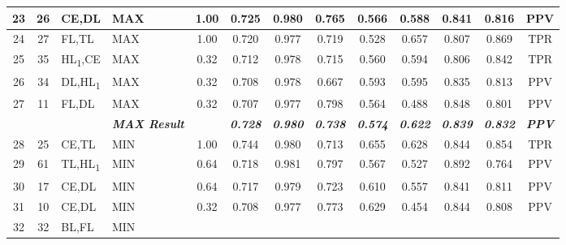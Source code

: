 \begin{table}[H]
{\begin{tabular}{ccl|l|c|c|c|c|c|c|c|c|c|}
    \multicolumn{1}{|c|}{23} &
    \multicolumn{1}{c|}{26} &
    CE,DL &
    MAX &
    1.00 &
    0.725 &
    0.980 &
    0.765 &
    0.566 &
    0.588 &
    0.841 &
    0.816 &
    PPV \\ \hline
  \multicolumn{1}{|c|}{24} &
    \multicolumn{1}{c|}{27} &
    FL,TL &
    MAX &
    1.00 &
    0.720 &
    0.977 &
    0.719 &
    0.528 &
    0.657 &
    0.807 &
    0.869 &
    TPR \\ \hline
  \multicolumn{1}{|c|}{25} &
    \multicolumn{1}{c|}{35} &
    HL\textsubscript{1},CE &
    MAX &
    0.32 &
    0.712 &
    0.978 &
    0.715 &
    0.560 &
    0.594 &
    0.806 &
    0.842 &
    TPR \\ \hline
  \multicolumn{1}{|c|}{26} &
    \multicolumn{1}{c|}{34} &
    DL,HL\textsubscript{1} &
    MAX &
    0.32 &
    0.708 &
    0.978 &
    0.667 &
    0.593 &
    0.595 &
    0.835 &
    0.813 &
    PPV \\ \hline
  \multicolumn{1}{|c|}{27} &
    \multicolumn{1}{c|}{11} &
    FL,DL &
    MAX &
    0.32 &
    0.707 &
    0.977 &
    0.798 &
    0.564 &
    0.488 &
    0.848 &
    0.801 &
    PPV \\ \hline
   &
    \textit{\textbf{}} &
     &
    \textit{\textbf{MAX Result}} &
     &
    \textit{\textbf{0.728}} &
    \textit{\textbf{0.980}} &
    \textit{\textbf{0.738}} &
    \textit{\textbf{0.574}} &
    \textit{\textbf{0.622}} &
    \textit{\textbf{0.839}} &
    \textit{\textbf{0.832}} &
    \textit{\textbf{PPV}} \\ \hline
  \multicolumn{1}{|c|}{28} &
    \multicolumn{1}{c|}{25} &
    CE,TL &
    MIN &
    1.00 &
    0.744 &
    0.980 &
    0.713 &
    0.655 &
    0.628 &
    0.844 &
    0.854 &
    TPR \\ \hline
  \multicolumn{1}{|c|}{29} &
    \multicolumn{1}{c|}{61} &
    TL,HL\textsubscript{1} &
    MIN &
    0.64 &
    0.718 &
    0.981 &
    0.797 &
    0.567 &
    0.527 &
    0.892 &
    0.764 &
    PPV \\ \hline
  \multicolumn{1}{|c|}{30} &
    \multicolumn{1}{c|}{17} &
    CE,DL &
    MIN &
    0.64 &
    0.717 &
    0.979 &
    0.723 &
    0.610 &
    0.557 &
    0.841 &
    0.811 &
    PPV \\ \hline
  \multicolumn{1}{|c|}{31} &
    \multicolumn{1}{c|}{10} &
    CE,DL &
    MIN &
    0.32 &
    0.708 &
    0.977 &
    0.773 &
    0.629 &
    0.454 &
    0.844 &
    0.808 &
    PPV \\ \hline
  \multicolumn{1}{|c|}{32} &
    \multicolumn{1}{c|}{32} &
    BL,FL &
    MIN &

\end{tabular}}
\end{table}
